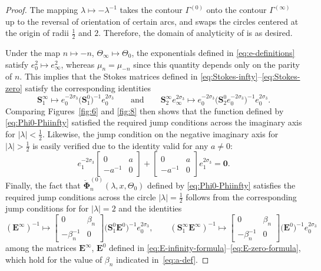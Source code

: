 \documentclass[11pt]{article}
\numberwithin{equation}{section}
\numberwithin{equation}{section}
\newcommand{\para}[1]{\breve{#1}}
\begin{document}
\begin{proof}
The mapping $\lambda\mapsto -\lambda^{-1}$ takes the contour $\Gamma^{(0)}$ onto the contour $\Gamma^{(\infty)}$ up to the reversal of orientation of certain arcs, and swaps the circles centered at the origin of radii $\frac{1}{2}$ and $2$. Therefore, the domain of analyticity of \smash{$\para{\mathbf{\Phi}}^{(0)}_n(\lambda,x, \Theta_0)$} is as desired.

Under the map $n \mapsto -n$, $\Theta_\infty \mapsto \Theta_0$, the exponentials defined in \eqref{eq:e-definitions} satisfy $e_{0}^2 \mapsto e_{\infty}^2$, whereas $\mu_n = \mu_{-n}$ since this quantity depends only on the parity of $n$. This implies that the Stokes matrices defined in \eqref{eq:Stokes-infty}--\eqref{eq:Stokes-zero} satisfy the corresponding identities
\begin{equation*}
 \mathbf{S}^\infty_1 \mapsto e_0^{-2\sigma_3}\big(\mathbf{S}^0_{1}\big)^{-1}e_0^{2\sigma_3} \qquad\text{and}\qquad
 \mathbf{S}^\infty_{{2}}e_\infty^{2\sigma_3} \mapsto e_0^{-2\sigma_3}\big(\mathbf{S}^0_{2} e_0^{-2\sigma_3}\big)^{-1} e_0^{2\sigma_3}.
\end{equation*}
Comparing Figures~\ref{fig:6} and \ref{fig:8} then shows that the function defined by \eqref{eq:Phi0-Phiinfty} satisfied the required jump conditions across the imaginary axis for $|\lambda|<\frac{1}{2}$. Likewise, the jump condition on the negative imaginary axis for $|\lambda|>\frac{1}{2}$ is easily verified due to the identity valid for any $a\neq 0$:
\begin{equation*}
 e_1^{-2 \sigma_3}\begin{bmatrix}0&a\\-a^{-1} & 0\end{bmatrix} +\begin{bmatrix}0 & a\\-a^{-1} & 0\end{bmatrix}e_1^{2 \sigma_3}=\mathbf{0}.
\end{equation*}
Finally, the fact that $\para{\mathbf{\Phi}}^{(0)}_n(\lambda,x, \Theta_0)$ defined by \eqref{eq:Phi0-Phiinfty} satisfies the required jump conditions across the circle $|\lambda|=\frac{1}{2}$ follows from the corresponding jump conditions for \smash{$\para{\mathbf{\Phi}}^{(\infty)}_{1-n}(\lambda,x, \Theta_0)$} for $|\lambda|=2$ and the identities
\begin{equation*}
 (\mathbf{E}^{\infty})^{-1} \mapsto \begin{bmatrix}0 & \beta_n\\-\beta_n^{-1} & 0\end{bmatrix} \big(\mathbf{S}_1^0 \mathbf{E}^0\big)^{-1} e_0^{2\sigma_3}, \qquad(\mathbf{S}_1^\infty \mathbf{E}^{\infty})^{-1} \mapsto \begin{bmatrix}0 & \beta_n\\-\beta_n^{-1} & 0\end{bmatrix} \big( \mathbf{E}^0\big)^{-1} e_0^{2\sigma_3}
\end{equation*}
among the matrices $\mathbf{E}^\infty$, $\mathbf{E}^0$ defined in \eqref{eq:E-infinity-formula}--\eqref{eq:E-zero-formula}, which hold for the value of $\beta_n$ indicated in~\eqref{eq:a-def}.


\end{proof}
\end{document}
